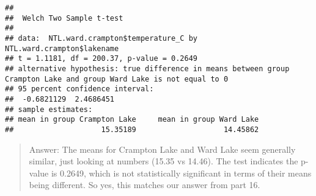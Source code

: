\documentclass[
]{article}
\begin{document}
\begin{verbatim}
## 
##  Welch Two Sample t-test
## 
## data:  NTL.ward.crampton$temperature_C by NTL.ward.crampton$lakename
## t = 1.1181, df = 200.37, p-value = 0.2649
## alternative hypothesis: true difference in means between group Crampton Lake and group Ward Lake is not equal to 0
## 95 percent confidence interval:
##  -0.6821129  2.4686451
## sample estimates:
## mean in group Crampton Lake     mean in group Ward Lake 
##                    15.35189                    14.45862
\end{verbatim}

\begin{quote}
Answer: The means for Crampton Lake and Ward Lake seem generally
similar, just looking at numbers (15.35 vs 14.46). The test indicates
the p-value is 0.2649, which is not statistically significant in terms
of their means being different. So yes, this matches our answer from
part 16.
\end{quote}
\end{document}
